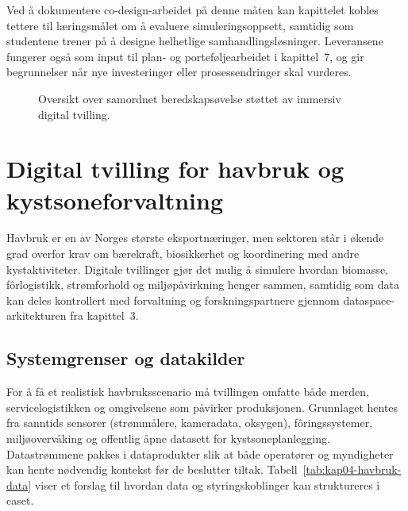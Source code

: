 Ved å dokumentere co-design-arbeidet på denne måten kan kapittelet kobles tettere til læringsmålet om å evaluere simuleringsoppsett, samtidig som studentene trener på å designe helhetlige samhandlingsløsninger. Leveransene fungerer også som input til plan- og porteføljearbeidet i kapittel~7, og gir begrunnelser når nye investeringer eller prosessendringer skal vurderes.

\begin{figure}[htbp]
    \centering
    \caption{Oversikt over samordnet beredskapsøvelse støttet av immersiv digital tvilling.}
    \label{fig:kap04-beredskap-case}
\end{figure}

\section{Digital tvilling for havbruk og kystsoneforvaltning}
Havbruk er en av Norges største eksportnæringer, men sektoren står i økende grad overfor krav om bærekraft, biosikkerhet og koordinering med andre kystaktiviteter. Digitale tvillinger gjør det mulig å simulere hvordan biomasse, fôrlogistikk, strømforhold og miljøpåvirkning henger sammen, samtidig som data kan deles kontrollert med forvaltning og forskningspartnere gjennom dataspace-arkitekturen fra kapittel~3.\citep{sintef2023havbrukstvilling}

\subsection{Systemgrenser og datakilder}
For å få et realistisk havbruksscenario må tvillingen omfatte både merden, servicelogistikken og omgivelsene som påvirker produksjonen. Grunnlaget hentes fra sanntids sensorer (strømmålere, kameradata, oksygen), fôringssystemer, miljøovervåking og offentlig åpne datasett for kystsoneplanlegging. Datastrømmene pakkes i dataprodukter slik at både operatører og myndigheter kan hente nødvendig kontekst før de beslutter tiltak. Tabell~\ref{tab:kap04-havbruk-data} viser et forslag til hvordan data og styringskoblinger kan struktureres i caset.

